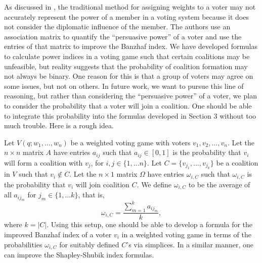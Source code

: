 \documentclass[11pt]{amsart}
\newcommand{\ifn}[1]{\footnote{{\bf Ismar: }#1}} %
\newcommand{\ffn}[1]{\footnote{{\bf Franjo: }#1}}
\theoremstyle{plain}
\theoremstyle{definition}
\theoremstyle{remark}
\begin{document}
As discussed in \cite{KHJ18}, the traditional method for assigning weights to a voter may not accurately represent the power of a member in a voting system because it does not consider the diplomatic influence of the member. The authors use an association matrix to quantify the ``persuasive power'' of a voter and use the entries of that matrix to improve the Banzhaf index. We have developed formulas to calculate power indices in a voting game such that certain coalitions may be unfeasible, but reality suggests that the probability of coalition formation may not always be binary. One reason for this is that a group of voters may agree on some issues, but not on others. In future work, we want to pursue this line of reasoning, but rather than considering the ``persuasive power'' of a voter, we plan to consider the probability that a voter will join a coalition. One should be able to integrate this probability into the formulas developed in Section 3 without too much trouble. Here is a rough idea.

Let $V(q;w_1,...,w_n)$ be a weighted voting game with voters $v_1,v_2,...,v_n$. Let the $n \times n$ matrix $A$ have entries $a_{ij}$ such that $a_{ij}\in [0,1]$ is the probability that $v_i$ will form a coalition with $v_j$, for $i,j \in \{1,...n\}$. Let $C=\{v_{j_1},...,v_{j_k}\}$ be a coalition in $V$ such that $v_i \notin C$. Let the $n\times 1$ matrix $\Omega$ have entries $\omega_{i,C}$ such that $\omega_{i,C}$ is the probability that $v_i$ will join coalition $C$. We define $\omega_{i,C}$ to be the average of all $a_{ij_m}$ for $j_m\in \{1,...k\}$, that is,
$$\omega_{i,C} = \frac{\sum_{m=1}^k a_{ij_m} }{k},$$
where $k=|C|$. Using this setup, one should be able to develop a formula for the improved Banzhaf index of a voter $v_i$ in a weighted voting game in terms of the probabilities $\omega_{i,C}$ for suitably defined $C$'s via simplices. In a similar manner, one can improve the Shapley-Shubik index formulas.

\end{document}
